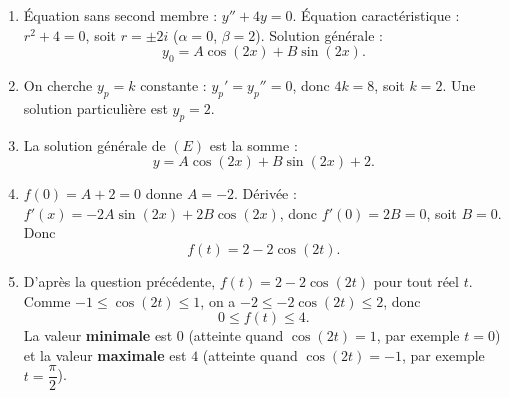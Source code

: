 \documentclass[11pt]{article}
\begin{document}
\begin{corrige}
\begin{enumerate}
\item Équation sans second membre : $y'' + 4y = 0$. Équation caractéristique : $r^2 + 4 = 0$, soit $r = \pm 2i$ ($\alpha = 0$, $\beta = 2$). Solution générale :
\[ y_0 = A\cos(2x) + B\sin(2x). \]
\item On cherche $y_p = k$ constante : $y_p' = y_p'' = 0$, donc $4k = 8$, soit $k = 2$. Une solution particulière est $y_p = 2$.
\item La solution générale de $(E)$ est la somme :
\[ y = A\cos(2x) + B\sin(2x) + 2. \]
\item $f(0) = A + 2 = 0$ donne $A = -2$. Dérivée : $f'(x) = -2A\sin(2x) + 2B\cos(2x)$, donc $f'(0) = 2B = 0$, soit $B = 0$. Donc
\[ f(t) = 2 - 2\cos(2t). \]
\item D'après la question précédente, $f(t) = 2 - 2\cos(2t)$ pour tout réel $t$. Comme $-1 \leq \cos(2t) \leq 1$, on a $-2 \leq -2\cos(2t) \leq 2$, donc
\[ 0 \leq f(t) \leq 4. \]
La valeur \textbf{minimale} est $0$ (atteinte quand $\cos(2t) = 1$, par exemple $t = 0$) et la valeur \textbf{maximale} est $4$ (atteinte quand $\cos(2t) = -1$, par exemple $t = \dfrac{\pi}{2}$).
\end{enumerate}
\end{corrige}
\end{document}
